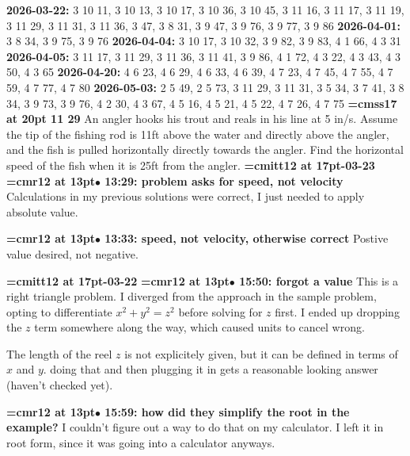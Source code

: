 {\noindent \bf 2026-03-22:} 3 10 11, 3 10 13, 3 10 17, 3 10 36, 3 10 45, 3 11 16, 3 11 17, 3 11 19, 3 11 29, 3 11 31, 3 11 36, 3 47, 3 8 31, 3 9 47, 3 9 76, 3 9 77, 3 9 86\smallskip
{\noindent \bf 2026-04-01:} 3 8 34, 3 9 75, 3 9 76\smallskip
{\noindent \bf 2026-04-04:} 3 10 17, 3 10 32, 3 9 82, 3 9 83, 4 1 66, 4 3 31\smallskip
{\noindent \bf 2026-04-05:} 3 11 17, 3 11 29, 3 11 36, 3 11 41, 3 9 86, 4 1 72, 4 3 22, 4 3 43, 4 3 50, 4 3 65\smallskip
{\noindent \bf 2026-04-20:} 4 6 23, 4 6 29, 4 6 33, 4 6 39, 4 7 23, 4 7 45, 4 7 55, 4 7 59, 4 7 77, 4 7 80\smallskip
{\noindent \bf 2026-05-03:} 2 5 49, 2 5 73, 3 11 29, 3 11 31, 3 5 34, 3 7 41, 3 8 34, 3 9 73, 3 9 76, 4 2 30, 4 3 67, 4 5 16, 4 5 21, 4 5 22, 4 7 26, 4 7 75\smallskip
\vfill \break
{}
{\medskip\noindent\bf\font\titlefont=cmss17 at 20pt 11 29}\medskip
An angler hooks his trout and reals in his line at 5 in/s.
Assume the tip of the fishing rod is 11ft above the water
and directly above the angler, and the fish is pulled horizontally
directly towards the angler. Find the horizontal speed of the fish
when it is 25ft from the angler.
{\medskip\noindent\bf\font\titlefont=cmitt12 at 17pt-03-23}\medskip
{\smallskip\noindent\bf\font\titlefont=cmr12 at 13pt\titlefont $\bullet$ 13:29: problem asks for speed, not velocity}\smallskip
Calculations in my previous solutions were correct, I just needed to apply absolute value.
\par

{\smallskip\noindent\bf\font\titlefont=cmr12 at 13pt\titlefont $\bullet$ 13:33: speed, not velocity, otherwise correct}\smallskip
Postive value desired, not negative.
\par

{\medskip\noindent\bf\font\titlefont=cmitt12 at 17pt-03-22}\medskip
{\smallskip\noindent\bf\font\titlefont=cmr12 at 13pt\titlefont $\bullet$ 15:50: forgot a value}\smallskip
This is a right triangle problem. I diverged from the approach in the sample problem, opting to differentiate $x^2 + y^2 = z^2$ before solving for $z$ first. I ended up dropping the $z$ term somewhere along the way, which caused units to cancel wrong.
\par

The length of the reel $z$ is not explicitely given, but it can be defined in terms of $x$ and $y$. doing that and then plugging it in gets a reasonable looking answer (haven't checked yet).
\par

{\smallskip\noindent\bf\font\titlefont=cmr12 at 13pt\titlefont $\bullet$ 15:59: how did they simplify the root in the example?}\smallskip
I couldn't figure out a way to do that on my calculator. I left it in root form, since it was going into a calculator anyways.
\par

